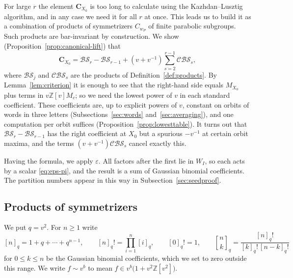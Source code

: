 \documentclass[11pt,a4paper,reqno]{amsart}
\numberwithin{equation}{section}
\theoremstyle{definition}
\theoremstyle{remark}
\theoremstyle{plain}
\newcommand{\C}{\mathbf C}
\newcommand{\eps}{\varepsilon}
\newcommand{\gb}[2]{\genfrac{[}{]}{0pt}{}{#1}{#2}_q}
\newcommand{\R}{\mathcal {BS}}
\newcommand{\V}{\mathcal {CBS}}
\begin{document}
For large $r$ the element $\C_{X_0}$ is too long to calculate using the Kazhdan--Lusztig algorithm, and in any case we need it for all $r$ at once.  This leads us to build it as a combination of
products of symmetrizers $C_{w_P}$ of finite parabolic subgroups. 
Such products are bar-invariant by construction.
We show (Proposition~\ref{prop:canonical-lift}) that
\[
 \C_{X_0}=\R_r-\R_{r-1}+(v+v^{-1})\sum_{s=2}^{r-1}\V_s,
\]
where $\R_j$ and $\V_s$ are the products of Definition~\ref{def:products}.
By Lemma~\ref{lem:criterion} it is enough to see
that the right-hand side equals $M_{X_0}$ plus terms in $v\mathbb Z[v]M_c$; 
so we need the lowest power of $v$ in each standard coefficient. 
These coefficients are, up to explicit powers of $v$, 
constant on orbits of words in three letters
(Subsections~\ref{sec:words} and~\ref{sec:averaging}), and one computation per orbit suffices
(Proposition~\ref{prop:lowesttable}). It turns out that $\R_r-\R_{r-1}$ has the right coefficient at $X_0$ but a spurious
$-v^{-1}$ at certain orbit maxima, and the terms $(v+v^{-1})\V_s$ cancel exactly this.

Having the formula, we apply $\eps$. All factors after the first lie in $W_I$, so each acts by a scalar
\eqref{eq:eps-pi}, and the result is a sum of Gaussian binomial coefficients. The partition numbers appear in this
way in Subsection~\ref{sec:seedproof}.

\subsection{Products of symmetrizers}\label{sec:products}

We put $q=v^2$. For $n\geq1$ write
\begin{equation}\label{eq:q-integers}
 [n]_q=1+q+\cdots+q^{n-1},\qquad
 [n]_q!=\prod_{i=1}^n[i]_q,\qquad [0]_q!=1,
 \qquad \gb nk=\frac{[n]_q!}{[k]_q!\,[n-k]_q!}
\end{equation} for $0\leq k\leq n$
be the Gaussian binomial coefficients, which we set to zero outside this range.
We write $f\sim v^b$ to mean $f\in v^b\bigl(1+v^2\mathbb Z[v^2]\bigr)$.
\end{document}
